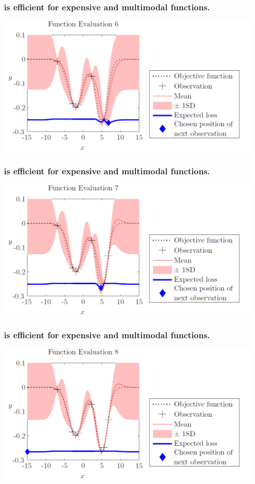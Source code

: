 \documentclass[12pt,onlymath]{beamer}
\begin{document}
\begin{frame}\frametitle{ is efficient for expensive and multimodal functions.}
\includegraphics[width = \textwidth]{./figures/bo6.pdf}
\end{frame}
\begin{frame}\frametitle{ is efficient for expensive and multimodal functions.}
\includegraphics[width = \textwidth]{./figures/bo7.pdf}
\end{frame}
\begin{frame}\frametitle{ is efficient for expensive and multimodal functions.}
\includegraphics[width = \textwidth]{./figures/bo8.pdf}
\end{frame}
\end{document}
